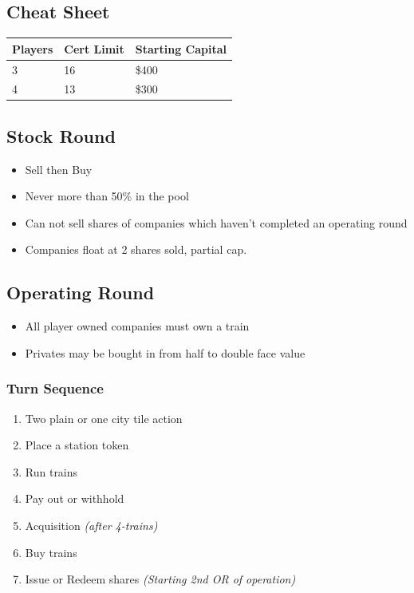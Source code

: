 \documentclass[letterpaper]{article}
\begin{document}
\thispagestyle{empty}
\begin{multicols}{2}
  \section*{Cheat Sheet}
  \begin{tabular}{l|l|l}
    \hline
    \textbf{Players} & \textbf{Cert Limit} & \textbf{Starting Capital} \\
    \hline
    \hline
    3 & 16 & \$400 \\
    4 & 13 & \$300 \\
    \hline
  \end{tabular}
  \subsection*{Stock Round}
  \begin{itemize}
  \item Sell then Buy
  \item Never more than 50\% in the pool
  \item Can not sell shares of companies which haven't completed an operating round
  \item Companies float at 2 shares sold, partial cap.
  \end{itemize}
  \subsection*{Operating Round}

  \begin{itemize}
  \item All player owned companies must own a train
  \item Privates may be bought in from half to double face value
  \end{itemize}

  \subsubsection*{Turn Sequence}
  \begin{enumerate}
  \item Two plain or one city tile action
  \item Place a station token
  \item Run trains
  \item Pay out or withhold
  \item Acquisition \textit{(after 4-trains)}
  \item Buy trains
  \item Issue or Redeem shares \textit{(Starting 2nd OR of operation)}
  \end{enumerate}


\end{multicols}
\end{document}

